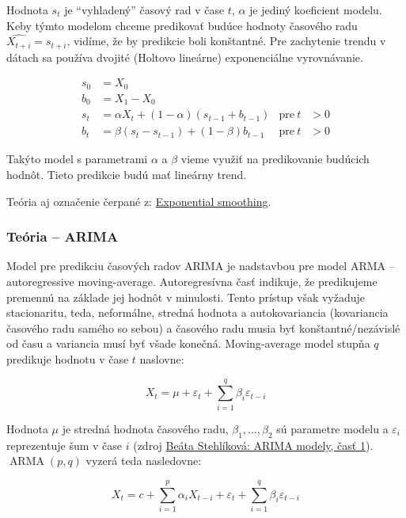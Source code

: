 \documentclass[main.tex]{subfiles}
\begin{document}
Hodnota $s_t$ je \enquote{vyhladený} časový rad v čase $t$, $\alpha$ je jediný koeficient modelu. Keby týmto modelom chceme predikovať budúce hodnoty časového radu $\widehat{X_{t+i}} = s_{t+i}$, vidíme, že by predikcie boli konštantné. Pre zachytenie trendu v dátach sa používa dvojité (Holtovo lineárne) exponenciálne vyrovnávanie.

\begin{align*}
	s_0 &= X_0 \\
	b_0 &= X_1 - X_0 \\
	s_t &= \alpha X_t + (1-\alpha) (s_{t-1} + b_{t-1}) & \text{pre}~t&>0 \\
	b_t &= \beta (s_t - s_{t-1}) + (1-\beta)b_{t-1} & \text{pre}~t&>0 
\end{align*}

Takýto model s parametrami $\alpha$ a $\beta$ vieme využiť na predikovanie budúcich hodnôt. Tieto predikcie budú mať lineárny trend.

Teória aj označenie čerpané z: \href{https://en.wikipedia.org/wiki/Exponential_smoothing#}{Exponential smoothing}.

\subsubsection{Teória -- ARIMA} 

Model pre predikciu časových radov ARIMA je nadstavbou pre model ARMA -- autoregressive moving-average. Autoregresívna časť indikuje, že predikujeme premennú na základe jej hodnôt v minulosti. Tento prístup však vyžaduje stacionaritu, teda, neformálne, stredná hodnota a autokovariancia (kovariancia časového radu samého so sebou) a časového radu musia byť konštantné/nezávislé od času a variancia musí byť všade konečná. Moving-average model stupňa $q$ predikuje hodnotu v čase $t$ naslovne:

\begin{equation*}
	X_t = \mu + \varepsilon_t + \sum_{i=1}^{q}\beta_i\varepsilon_{t-i}
\end{equation*}

Hodnota $\mu$ je stredná hodnota časového radu, $\beta_1,\dots, \beta_2$ sú parametre modelu a $\varepsilon_i$ reprezentuje šum v čase $i$ (zdroj \href{http://www.iam.fmph.uniba.sk/institute/stehlikova/cr19/arima1.html#maq-proces-vyssieho-radu}{Beáta Stehlíková: ARIMA modely, časť 1}). $\operatorname{ARMA}(p, q)$ vyzerá teda nasledovne:

\begin{equation*}
	X_t = c + \sum_{i=1}^{p}\alpha_i X_{t-i} + \varepsilon_t + \sum_{i=1}^{q}\beta_i\varepsilon_{t-i}
\end{equation*}
\end{document}
